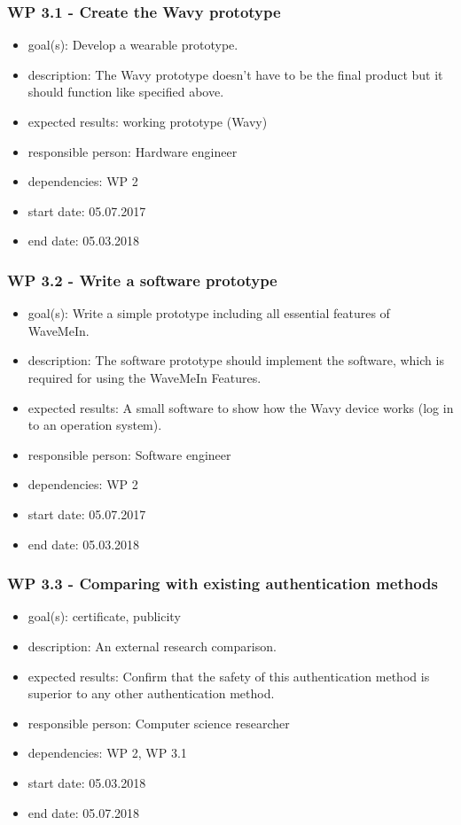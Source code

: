\subsubsection*{WP 3.1 - Create the Wavy prototype}
\begin{itemize}
 \item goal(s): Develop a wearable prototype.
 \item description: The Wavy prototype doesn’t have to be the final product but it should function like specified above.
 \item expected results: working prototype (Wavy)
 \item responsible person: Hardware engineer
 \item dependencies: WP 2
 \item start date: 05.07.2017
 \item end date: 05.03.2018
\end{itemize}

\subsubsection*{WP 3.2 - Write a software prototype}
\begin{itemize}
 \item goal(s): Write a simple prototype including all essential features of WaveMeIn.
 \item description: The software prototype should implement the software, which is required for using the WaveMeIn Features.
 \item expected results: A small software to show how the Wavy device works (log in to an operation system).
 \item responsible person: Software engineer
 \item dependencies: WP 2
 \item start date: 05.07.2017
 \item end date: 05.03.2018
\end{itemize}

\subsubsection*{WP 3.3 - Comparing with existing authentication methods}
\begin{itemize}
 \item goal(s): certificate, publicity
 \item description: An external research comparison.
 \item expected results: Confirm that the safety of this authentication method is superior to any other authentication method.
 \item responsible person: Computer science researcher
 \item dependencies: WP 2, WP 3.1
 \item start date: 05.03.2018
 \item end date: 05.07.2018
\end{itemize}
